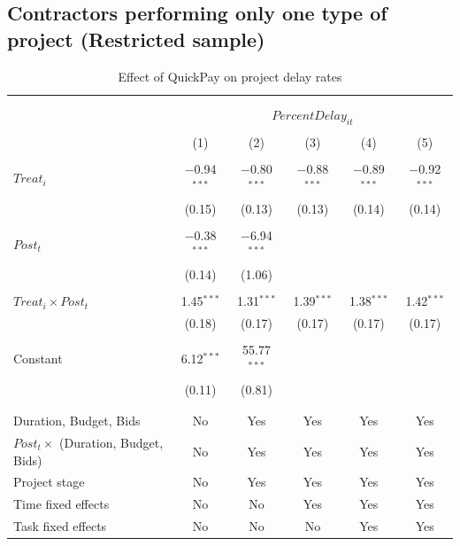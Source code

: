 \documentclass[
]{article}
\begin{document}
\hypertarget{contractors-performing-only-one-type-of-project-restricted-sample}{%
\subsection{Contractors performing only one type of project (Restricted
sample)}\label{contractors-performing-only-one-type-of-project-restricted-sample}}

\begin{table}[H] \centering 
  \caption{Effect of QuickPay on project delay rates} 
  \label{} 
\small 
\begin{tabular}{@{\extracolsep{-2pt}}lccccc} 
\\[-1.8ex]\hline 
\hline \\[-1.8ex] 
\\[-1.8ex] & \multicolumn{5}{c}{$PercentDelay_{it}$} \\ 
\\[-1.8ex] & (1) & (2) & (3) & (4) & (5)\\ 
\hline \\[-1.8ex] 
 $Treat_i$ & $-$0.94$^{***}$ & $-$0.80$^{***}$ & $-$0.88$^{***}$ & $-$0.89$^{***}$ & $-$0.92$^{***}$ \\ 
  & (0.15) & (0.13) & (0.13) & (0.14) & (0.14) \\ 
  & & & & & \\ 
 $Post_t$ & $-$0.38$^{***}$ & $-$6.94$^{***}$ &  &  &  \\ 
  & (0.14) & (1.06) &  &  &  \\ 
  & & & & & \\ 
 $Treat_i \times Post_t$ & 1.45$^{***}$ & 1.31$^{***}$ & 1.39$^{***}$ & 1.38$^{***}$ & 1.42$^{***}$ \\ 
  & (0.18) & (0.17) & (0.17) & (0.17) & (0.17) \\ 
  & & & & & \\ 
 Constant & 6.12$^{***}$ & 55.77$^{***}$ &  &  &  \\ 
  & (0.11) & (0.81) &  &  &  \\ 
  & & & & & \\ 
\hline \\[-1.8ex] 
Duration, Budget, Bids & No & Yes & Yes & Yes & Yes \\ 
$Post_t \times$  (Duration, Budget, Bids) & No & Yes & Yes & Yes & Yes \\ 
Project stage & No & Yes & Yes & Yes & Yes \\ 
Time fixed effects & No & No & Yes & Yes & Yes \\ 
Task fixed effects & No & No & No & Yes & Yes \\ 

\end{tabular}
\end{table}
\end{document}
